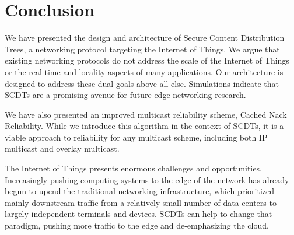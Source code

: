\section{Conclusion}
We have presented the design and architecture of Secure Content Distribution Trees, a networking protocol targeting the Internet of Things. We argue that existing networking protocols do not address the scale of the Internet of Things or the real-time and locality aspects of many applications. Our architecture is designed to address these dual goals above all else. Simulations indicate that SCDTs are a promising avenue for future edge networking research.

We have also presented an improved multicast reliability scheme, Cached Nack Reliability. While we introduce this algorithm in the context of SCDTs, it is a viable approach to reliability for any multicast scheme, including both IP multicast and overlay multicast. 

The Internet of Things presents enormous challenges and opportunities. Increasingly pushing computing systems to the edge of the network has already begun to upend the traditional networking infrastructure, which prioritized mainly-downstream traffic from a relatively small number of data centers to largely-independent terminals and devices. SCDTs can help to change that paradigm, pushing more traffic to the edge and de-emphasizing the cloud.
